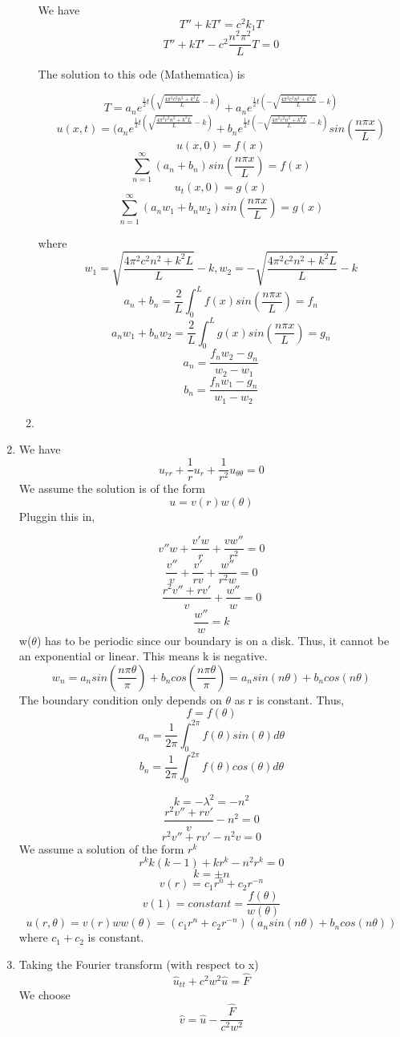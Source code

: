 \documentclass[a4paper,12 pt]{article}
\begin{document}
\begin{enumerate}
\begin{enumerate}
We have 
\[T'' +kT'= c^2k_1T\]
\[T'' +kT'- c^2\frac{n^2\pi^2}{L}T =0\]

The solution to this ode (Mathematica) is 

\[T=  a_n e^{\frac{1}{2} t (\sqrt{\frac{4 \pi^2 c^2 n^2 + k^2 L}{L}} - k)}+ a_n e^{\frac{1}{2} t (-\sqrt{\frac{4 \pi^2 c^2 n^2 + k^2 L}{L}} - k)} \]
\[u(x,t)= (a_n e^{\frac{1}{2} t (\sqrt{\frac{4 \pi^2 c^2 n^2 + k^2 L}{L}} - k)}+ b_n e^{\frac{1}{2} t (-\sqrt{\frac{4 \pi^2 c^2 n^2 + k^2 L}{L}} - k)}sin(\frac{n\pi x}{L})\]
\[u(x,0)= f(x)\]
\[\sum_{n=1}^{\infty}(a_n+b_n)sin(\frac{n\pi x}{L})= f(x)\]
\[u_t(x,0)=g(x)\]
\[\sum_{n=1}^{\infty} (a_nw_1+b_nw_2)sin(\frac{n\pi x}{L})= g(x) \]

where 
\[w_1=\sqrt{\frac{4 \pi^2 c^2 n^2 + k^2 L}{L}} - k,w_2=- \sqrt{\frac{4 \pi^2 c^2 n^2 + k^2 L}{L}} - k\]
\[a_n+b_n = \frac{2}{L}\int_{0}^{L}f(x)sin(\frac{n\pi x}{L})= f_n\]
\[a_nw_1+b_nw_2= \frac{2}{L}\int_{0}^{L}g(x)sin(\frac{n\pi x}{L})= g_n\]
\[a_n= \frac{f_nw_2-g_n}{w_2-w_1}\]
\[b_n= \frac{f_nw_1-g_n}{w_1-w_2}\]
\item 
\newpage
\end{enumerate}
\item
 We have 
 \[ u_{rr}+\frac{1}{r}u_{r}+\frac{1}{r^2}u_{\theta \theta} = 0\]
 We assume the solution is of the form 
 \[u = v(r)w(\theta)\]
 Pluggin this in, 
 
\[v''w +\frac{v'w}{r}+\frac{vw''}{r^2}=0 \]
\[\frac{v''}{v} +\frac{v'}{rv}+\frac{w''}{r^2w}=0 \]
\[\frac{r^2v''+rv'}{v}+\frac{w''}{w}=0 \]
\[\frac{w''}{w}=k \]
w($\theta$) has to be periodic since our boundary is on a disk. Thus, it cannot be an exponential or linear. This means k is negative.
\[ w_n = a_n sin(\frac{n\pi \theta}{\pi })+ b_n cos(\frac{n\pi \theta}{\pi })= a_nsin(n \theta)+ b_ncos(n \theta)\]
The boundary condition only depends on $\theta$ as r is constant. Thus, 
\[f=f(\theta)\]
\[ a_n = \frac{1}{2\pi}\int_{0}^{2\pi}f(\theta)sin(\theta)d\theta\]
\[ b_n = \frac{1}{2\pi} \int_{0}^{2\pi}f(\theta)cos(\theta)d\theta\]



\[k =-\lambda^2 = -n^2 \]
\[\frac{r^2v''+rv'}{v}-n^2=0 \]
\[r^2v''+rv'-n^2v=0 \]
We assume a solution of the form $r^k$
\[r^{k}k(k-1)+ kr^{k}-n^2r^{k}=0\]
\[k=  \pm n\]
\[v(r)= c_1 r^n + c_2 r^{-n}\]
\[v(1)= constant= \frac{f(\theta)}{w(\theta)}\]
\[u(r,\theta)= v(r)w w(\theta) = (c_1 r^n + c_2 r^{-n})(a_nsin(n \theta)+ b_ncos(n \theta)) \]
where $c_1 + c_2$ is constant.


\item
Taking the Fourier transform (with respect to x)
\[ \hat{u}_{tt}+c^2w^2\hat{u} = \hat{F}\]
We choose
\[ \hat{v}=\hat{u}-\frac{\hat{F}}{c^2w^2}\]


\end{enumerate}
\end{document}

